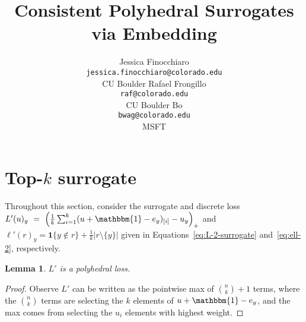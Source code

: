 \documentclass[12pt]{article}
\title{Consistent Polyhedral Surrogates via Embedding}
\author{%
 Jessica Finocchiaro\raf{Jessie?} \\
 \texttt{jessica.finocchiaro@colorado.edu}\\
 CU Boulder
 \And
 Rafael Frongillo\\
 \texttt{raf@colorado.edu}\\
 CU Boulder
 \And
 Bo\\
 \texttt{bwag@colorado.edu}\\
 MSFT
}
\newcommand{\risk}[1]{\underline{#1}}
\newcommand{\ones}{\mathbbm{1}}
\newcommand{\Ind}[1]{\mathbf{1}\{#1\}}
\newtheorem{lemma}{Lemma}
\begin{document}
\appendix


\section{Top-$k$ surrogate}
Throughout this section, consider the surrogate and discrete loss $L'(u)_y~=~\left(\frac{1}{k} \sum_{i=1}^k (u + \ones - e_y)_{[i]} - u_y \right)_+$ and $\ell'(r)_y = \Ind{y \not\in r} + \frac{1}{k} |r \setminus \{y\}|$ given in Equations~\ref{eq:L-2-surrogate} and~\ref{eq:ell-2}, respectively.

\begin{lemma}\label{lem:top-k-polyhedral}
	$L'$ is a polyhedral loss.
\end{lemma}
\begin{proof}
	Observe $L'$ can be written as the pointwise max of $\binom{n}{k} +1$ terms, where the $\binom{n}{k}$ terms are selecting the $k$ elements of $u + \ones - e_y$, and the max comes from selecting the $u_i$ elements with highest weight.
\end{proof}
\end{document}
